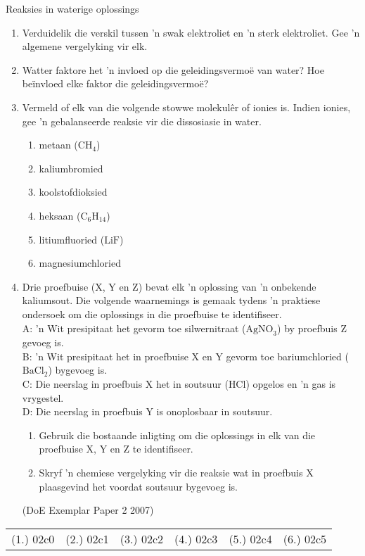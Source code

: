 \begin{eocexercises}{Reaksies in waterige oplossings}
\begin{enumerate}[noitemsep, label=\textbf{\arabic*}. ]
        \item Verduidelik die verskil tussen 'n swak elektroliet en 'n sterk elektroliet. Gee 'n algemene vergelyking vir elk.
           \item  Watter faktore het 'n invloed op die geleidingsvermo\"{e} van water? Hoe be\"invloed elke faktor die geleidingsvermo\"{e}?
            \item Vermeld of elk van die volgende stowwe molekulêr of ionies is. Indien ionies, gee 'n gebalanseerde reaksie vir die dissosiasie in water.
\label{m38719*id7342}\begin{enumerate}[noitemsep, label=\textbf{\alph*}. ] 
            \item metaan (${\text{CH}}_{4}$)
\item kaliumbromied
\item koolstofdioksied
\item heksaan (${\text{C}}_{6}{\text{H}}_{14}$)
\item litiumfluoried ($\text{LiF}$)
\item magnesiumchloried
\end{enumerate}
\label{m38719*uid127}\item  Drie proefbuise (X, Y en Z) bevat elk 'n oplossing van 'n onbekende kaliumsout. Die volgende waarnemings is gemaak tydens 'n praktiese ondersoek om die oplossings in die proefbuise te identifiseer. \\
A: 'n Wit presipitaat het gevorm toe silwernitraat (${\text{AgNO}}_{3}$) by proefbuis Z gevoeg is.\\
B: 'n Wit presipitaat het in proefbuise X en Y gevorm toe bariumchloried (${\text{BaCl}}_{2}$) bygevoeg is.\\
C: Die neerslag in proefbuis X het in soutsuur ($\text{HCl}$) opgelos en 'n gas is vrygestel.\\
D: Die neerslag in proefbuis Y is onoplosbaar in soutsuur.
\label{m38719*id343466}\begin{enumerate}[noitemsep, label=\textbf{\alph*}. ] 
            \label{m38719*uid128}\item Gebruik die bostaande inligting om die oplossings in elk van die proefbuise X, Y en Z te identifiseer.
\label{m38719*uid129}\item Skryf 'n chemiese vergelyking vir die reaksie wat in proefbuis X plaasgevind het voordat soutsuur bygevoeg is. 
\end{enumerate}
(DoE Exemplar Paper 2 2007)
\end{enumerate}

\par \practiceinfo
\par \begin{tabular}[h]{cccccc}
(1.)	02c0	&
(2.)	02c1	&
(3.)	02c2	&
(4.)	02c3	&
(5.)	02c4	&
(6.)	02c5	\\ %
\end{tabular}
\end{eocexercises}
